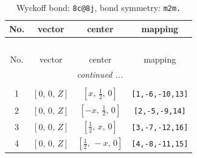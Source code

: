 \documentclass[fleqn,8pt]{jsarticle}
\begin{document}
\renewcommand{\arraystretch}{1.2}
\begin{longtable}{cccc}
\caption{Wyckoff bond: {\tt 8c@8j}, bond symmetry: {\tt m2m.}}
 \\
 \hline \hline
No. & vector & center & mapping \\ \hline \endfirsthead

\multicolumn{3}{l}{\tablename\ \thetable{}} \\
 \hline \hline
No. & vector & center & mapping \\ \hline \endhead

 \hline \hline
\multicolumn{3}{r}{\footnotesize\it continued ...} \\ \endfoot

 \hline \hline
\multicolumn{3}{r}{} \\ \endlastfoot

1 & $\left[ 0,\, 0,\, Z \right]$ & $\left[ x,\, \frac{1}{2},\, 0 \right]$ & {\tt [1,-6,-10,13]} \\ \hline
2 & $\left[ 0,\, 0,\, Z \right]$ & $\left[ - x,\, \frac{1}{2},\, 0 \right]$ & {\tt [2,-5,-9,14]} \\ \hline
3 & $\left[ 0,\, 0,\, Z \right]$ & $\left[ \frac{1}{2},\, x,\, 0 \right]$ & {\tt [3,-7,-12,16]} \\ \hline
4 & $\left[ 0,\, 0,\, Z \right]$ & $\left[ \frac{1}{2},\, - x,\, 0 \right]$ & {\tt [4,-8,-11,15]} \\
\end{longtable}
\renewcommand{\arraystretch}{1.2}
\end{document}
